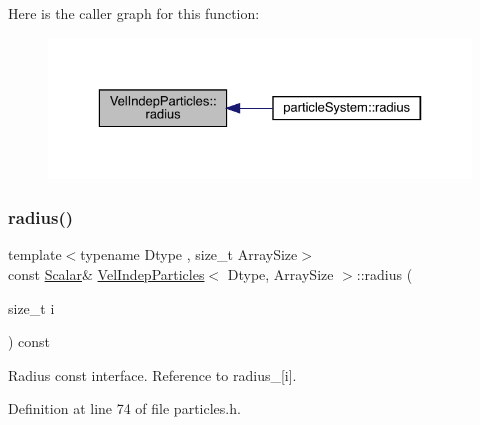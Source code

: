 Here is the caller graph for this function\+:\nopagebreak
\begin{figure}[H]
\begin{center}
\leavevmode
\includegraphics[width=329pt]{class_vel_indep_particles_a764cb67485dbd51be3509177df6c355a_icgraph}
\end{center}
\end{figure}
\mbox{\label{class_vel_indep_particles_a99dc089a06437f5f382c2fb9aaf10859}} 
\subsubsection{\texorpdfstring{radius()}{radius()}\hspace{0.1cm}{\footnotesize\ttfamily [2/2]}}
{\footnotesize\ttfamily template$<$typename Dtype , size\+\_\+t Array\+Size$>$ \\
const \mbox{\hyperlink{class_vel_indep_particles_a5d275b22f0d759f360ddd80e78f4b466}{Scalar}}\& \mbox{\hyperlink{class_vel_indep_particles}{Vel\+Indep\+Particles}}$<$ Dtype, Array\+Size $>$\+::radius (\begin{DoxyParamCaption}\item[{size\+\_\+t}]{i }\end{DoxyParamCaption}) const\hspace{0.3cm}{\ttfamily [inline]}}



Radius const interface. Reference to radius\+\_\+\mbox{[}i\mbox{]}. 



Definition at line 74 of file particles.\+h.

\mbox{\label{class_vel_indep_particles_a7c2968d7757eb6b3dc59259fadcf661c}} 
